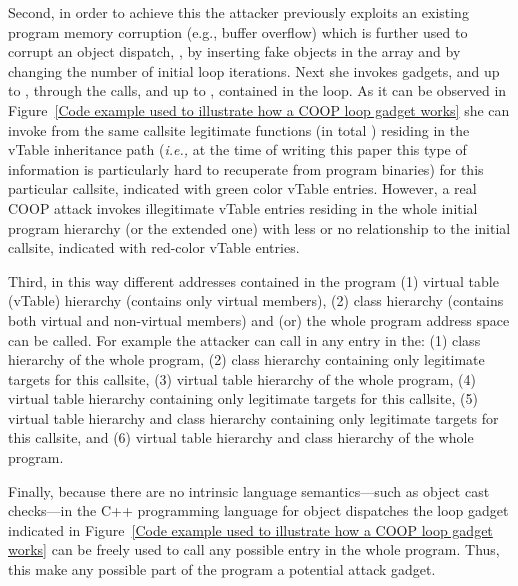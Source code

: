 Second, in order to achieve this the attacker previously exploits an existing program memory corruption (e.g., buffer overflow) 
which is further used to corrupt an object dispatch, , by inserting fake objects in the array and by changing the number of initial loop iterations.
Next she invokes gadgets,  and  up to {\tiny{}}, 
through the calls,  and  up to {\tiny{}}, contained in the loop. 
As it can be observed in Figure~\ref{Code example used to illustrate how a COOP loop gadget works} she 
can invoke from the same callsite legitimate functions (in total {\tiny{}}) residing in the vTable inheritance path
(\textit{i.e.,} at the time of writing this paper this type of information is particularly hard to recuperate from program binaries)
for this particular callsite, indicated with green color vTable entries. 
However, a real COOP attack invokes illegitimate vTable entries residing in the whole initial program hierarchy (or the extended one)
with less or no relationship to the initial callsite,
indicated with red-color vTable entries.

Third, in this way different addresses contained in the program (1) virtual table (vTable) hierarchy (contains only virtual members), 
(2) class hierarchy (contains both virtual and non-virtual members) and (or) the whole program address space can be called. 
For example the attacker can call in any entry in the:
(1) class hierarchy of the whole program,
(2) class hierarchy containing only legitimate targets for this callsite,
(3) virtual table hierarchy of the whole program,
(4) virtual table hierarchy containing only legitimate targets for this callsite,
(5) virtual table hierarchy and class hierarchy containing only legitimate targets for this callsite, and
(6) virtual table hierarchy and class hierarchy of the whole program.

Finally, because there are no intrinsic language semantics---such as object cast checks---in the C++ programming language for object dispatches
the loop gadget indicated in Figure~\ref{Code example used to illustrate how a COOP loop gadget works} can be freely used to call 
any possible entry in the whole program. Thus, this make any possible part of the program a potential attack gadget.

